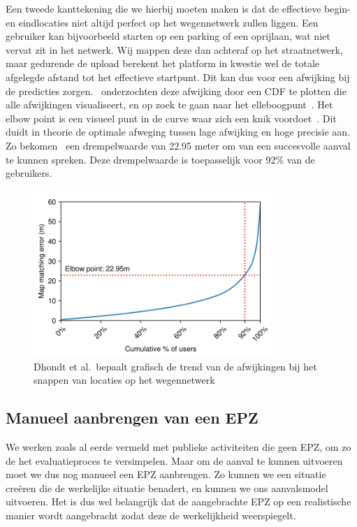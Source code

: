Een tweede kanttekening die we hierbij moeten maken is dat de effectieve begin-
en eindlocaties niet altijd perfect op het wegennetwerk zullen liggen. Een
gebruiker kan bijvoorbeeld starten op een parking of een oprijlaan, wat niet
vervat zit in het netwerk. Wij mappen deze dan achteraf op het straatnetwerk,
maar gedurende de upload berekent het platform in kwestie wel de totale
afgelegde afstand tot het effectieve startpunt. Dit kan dus voor een afwijking
bij de predicties zorgen.~\citeauthor{Dhondt} onderzochten deze afwijking door
een \ac{CDF} te plotten die alle afwijkingen visualiseert, en op zoek te gaan
naar het elleboogpunt~\cite{Dhondt}. Het elbow point is een visueel punt in de
curve waar zich een knik voordoet~\cite{Introduc22:online}. Dit duidt in
theorie de optimale afweging tussen lage afwijking en hoge precisie aan. Zo
bekomen~\citeauthor{Dhondt} een drempelwaarde van 22.95 meter om van een
succesvolle aanval te kunnen spreken. Deze drempelwaarde is toepasselijk voor
92\% van de gebruikers.
\begin{figure}[h]
    \centering
    \includegraphics[width=0.8\textwidth]{fig/Afwijkingen&Analyses/OvershootMappingDistance.png}
    \caption{Dhondt et al.\ bepaalt grafisch de trend van de afwijkingen bij het snappen van locaties op het wegennetwerk~\cite{Dhondt}}\label{fig:overshootMappingDistance}
\end{figure}

\subsection{Manueel aanbrengen van een EPZ}\label{sec:zelf_cloaking}
We werken zoals al eerde vermeld met publieke activiteiten die geen \ac{EPZ},
om zo de het evaluatieproces te versimpelen. Maar om de aanval te kunnen
uitvoeren moet we dus nog manueel een \ac{EPZ} aanbrengen. Zo kunnen we een
situatie creëren die de werkelijke situatie benadert, en kunnen we ons
aanvalsmodel uitvoeren. Het is dus wel belangrijk dat de aangebrachte \ac{EPZ}
op een realistische manier wordt aangebracht zodat deze de werkelijkheid
weerspiegelt.

